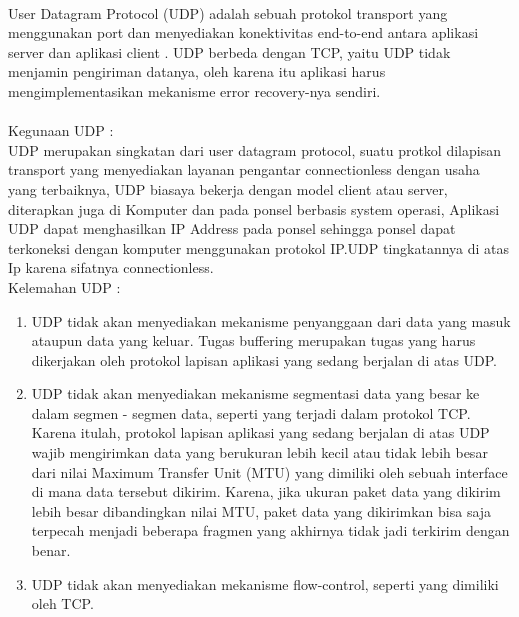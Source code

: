 \paragraph{}
\hspace{1cm}
User Datagram Protocol (UDP) adalah sebuah protokol transport yang menggunakan port dan menyediakan konektivitas end-to-end antara aplikasi server dan aplikasi client . UDP berbeda dengan TCP, yaitu UDP tidak menjamin pengiriman datanya, oleh karena itu aplikasi harus mengimplementasikan mekanisme error recovery-nya sendiri.\\
\paragraph{}
\hspace{1cm}
Kegunaan UDP : \\
UDP merupakan singkatan dari user datagram protocol, suatu protkol dilapisan transport yang menyediakan  layanan pengantar connectionless dengan usaha yang terbaiknya, UDP biasaya bekerja dengan model client atau server, diterapkan juga di Komputer dan pada ponsel berbasis system operasi, Aplikasi UDP dapat menghasilkan IP Address pada ponsel sehingga ponsel dapat terkoneksi dengan komputer menggunakan protokol IP.UDP tingkatannya di atas Ip karena sifatnya connectionless.\\

Kelemahan UDP :
\begin{enumerate}
\item UDP tidak akan menyediakan mekanisme penyanggaan dari data yang masuk ataupun data yang keluar. Tugas buffering merupakan tugas yang harus dikerjakan oleh protokol lapisan aplikasi yang sedang berjalan di atas UDP.
\item UDP tidak akan menyediakan mekanisme segmentasi data yang besar ke dalam segmen - segmen data, seperti yang terjadi dalam protokol TCP. Karena itulah, protokol lapisan aplikasi yang sedang berjalan di atas UDP wajib mengirimkan data yang berukuran lebih kecil atau tidak lebih besar dari nilai Maximum Transfer Unit (MTU) yang dimiliki oleh sebuah interface di mana data tersebut dikirim. Karena, jika ukuran paket data yang dikirim lebih besar dibandingkan nilai MTU, paket data yang dikirimkan bisa saja terpecah menjadi beberapa fragmen yang akhirnya tidak jadi terkirim dengan benar.
\item UDP tidak akan menyediakan mekanisme flow-control, seperti yang dimiliki oleh TCP.
\end{enumerate}

